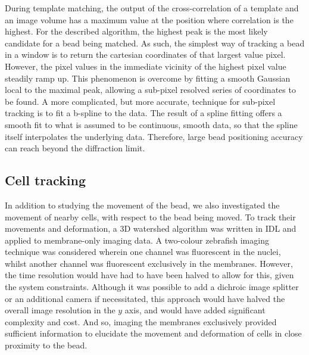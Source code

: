 During template matching, the output of the cross-correlation of a template and an image volume has a maximum value at the position where correlation is the highest.
For the described algorithm, the highest peak is the most likely candidate for a bead being matched.
As such, the simplest way of tracking a bead in a window is to return the cartesian coordinates of that largest value pixel.
However, the pixel values in the immediate vicinity of the highest pixel value steadily ramp up.
This phenomenon is overcome by fitting a smooth Gaussian local to the maximal peak, allowing a sub-pixel resolved series of coordinates to be found.
A more complicated, but more accurate, technique for sub-pixel tracking is to fit a b-spline to the data.
The result of a spline fitting offers a smooth fit to what is assumed to be continuous, smooth data, so that the spline itself interpolates the underlying data. Therefore, large bead positioning accuracy can reach beyond the diffraction limit.

\subsection{Cell tracking}

In addition to studying the movement of the bead, we also investigated the movement of nearby cells, with respect to the bead being moved.
To track their movements and deformation, a 3D watershed algorithm was written in IDL and applied to membrane-only imaging data.
A two-colour \gls{zebrafish} imaging technique was considered wherein one channel was fluorescent in the nuclei, whilst another channel was fluorescent exclusively in the membranes.
However, the time resolution would have had to have been halved to allow for this, given the system constraints.
Although it was possible to add a dichroic image splitter or an additional camera if necessitated, this approach would have halved the overall image resolution in the \(y\) axis, and would have added significant complexity and cost.
And so, imaging the membranes exclusively provided sufficient information to elucidate the movement and deformation of cells in close proximity to the bead.

